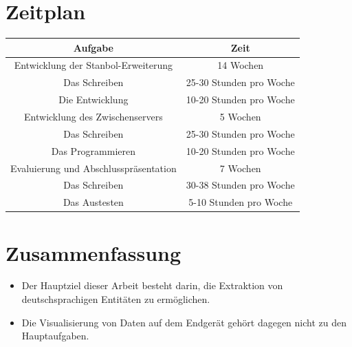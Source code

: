 \documentclass{beamer}
\begin{document}
  \section{Zeitplan}
  \begin{frame}[c]
  \begin{center}
    \begin{tabular}{|c|c|}
  \hline 
  \textbf{Aufgabe} & \textbf{Zeit} \\ 
  \hline 
  Entwicklung der Stanbol-Erweiterung & 14 Wochen \\
  Das Schreiben & 25-30 Stunden pro Woche \\
  Die Entwicklung & 10-20 Stunden pro Woche \\
  \hline 
  Entwicklung des Zwischenservers & 5 Wochen \\ 
  Das Schreiben & 25-30 Stunden pro Woche \\
  Das Programmieren & 10-20 Stunden pro Woche \\
  \hline 
  Evaluierung und Abschlusspräsentation & 7 Wochen \\ 
  Das Schreiben & 30-38 Stunden pro Woche \\
  Das Austesten & 5-10 Stunden pro Woche \\
  \hline 
  \end{tabular} 
  \end{center}
  \end{frame}
  \section{Zusammenfassung}
  \begin{frame}[c]
  \begin{itemize}
  \item Der Hauptziel dieser Arbeit besteht darin, die Extraktion von deutschsprachigen Entitäten zu ermöglichen.
  \item Die Visualisierung von Daten auf dem Endgerät gehört dagegen nicht zu den Hauptaufgaben.
  \end{itemize}
  \end{frame}
\end{document}

